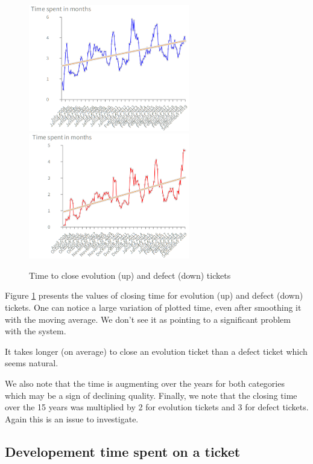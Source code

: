 \documentclass[10pt,conference]{IEEEtran}
\begin{document}
\begin{figure}[htbp]
  \centering
  \includegraphics[width=70mm]{./images/openCloseEvol.png} \\
  \includegraphics[width=70mm]{./images/openCloseBug.png}
  \caption{Time to close evolution (up) and defect (down) tickets}
  \label{fig:closingTime}
\end{figure}

Figure \ref{fig:closingTime} presents the values of closing time for evolution (up) and defect (down) tickets.
One can notice a large variation of plotted time, even after smoothing it with the moving average. 
We don't see it as  pointing to a significant problem with the system.


It takes longer (on average) to close an evolution ticket than a defect ticket which seems natural.

We also note that the time is augmenting over the years for both categories which may be a sign of declining quality.
Finally, we note that the closing time over the 15 years was multiplied by 2 for evolution tickets and 3 for defect tickets.
Again this is an issue to investigate.


\subsection{Developement time spent on a ticket}
\end{document}
